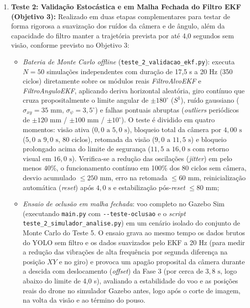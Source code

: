 \begin{enumerate}
	\item \textbf{Teste 2: Validação Estocástica e em Malha Fechada do Filtro EKF (Objetivo 3):} Realizado em duas etapas complementares para testar de forma rigorosa a suavização dos ruídos da câmera e de ângulo, além da capacidade do filtro manter a trajetória prevista por até 4,0 segundos sem visão, conforme previsto no Objetivo 3:
	\begin{itemize}
		\item \textit{Bateria de Monte Carlo offline} (\texttt{teste\_2\_\allowbreak validacao\_\allowbreak ekf.py}): executa $N = 50$ simulações independentes com duração de 17,5 s a 20 Hz (350 ciclos) diretamente sobre os módulos reais \textit{FiltroAlvoEKF} e \textit{FiltroAnguloEKF}, aplicando deriva horizontal aleatória, giro contínuo que cruza propositalmente o limite angular de $\pm 180^\circ$ ($S^1$), ruído gaussiano ($\sigma_{xy} = 35\text{ mm}$, $\sigma_\psi = 3{,}5^\circ$) e falhas pontuais abruptas (\textit{outliers} periódicos de $\pm 120\text{ mm}$ / $\pm 100\text{ mm}$ / $\pm 10^\circ$). O teste é dividido em quatro momentos: visão ativa ($0{,}0\text{ a } 5{,}0\text{ s}$), bloqueio total da câmera por $4{,}00\text{ s}$ ($5{,}0\text{ a } 9{,}0\text{ s}$, 80 ciclos), retomada da visão ($9{,}0\text{ a } 11{,}5\text{ s}$) e bloqueio prolongado acima do limite de segurança ($11{,}5\text{ a } 16{,}0\text{ s}$ com retorno visual em $16{,}0\text{ s}$). Verifica-se a redução das oscilações (\textit{jitter}) em pelo menos $40\%$, o funcionamento contínuo em 100\% dos 80 ciclos sem câmera, desvio acumulado $\le 250\text{ mm}$, erro na retomada $\le 60\text{ mm}$, reinicialização automática (\textit{reset}) após $4{,}0\text{ s}$ e estabilização pós-\textit{reset} $\le 80\text{ mm}$;
		\item \textit{Ensaio de oclusão em malha fechada}: voo completo no Gazebo Sim (executando \texttt{main.py} com \texttt{-{}-teste-\allowbreak oclusao} e o \textit{script} \texttt{teste\_2\_\allowbreak simulador\_\allowbreak analise.py}) em um cenário isolado do conjunto de Monte Carlo do Teste 5. O ensaio grava ao mesmo tempo os dados brutos do YOLO sem filtro e os dados suavizados pelo EKF a 20 Hz (para medir a redução das vibrações de alta frequência por segunda diferença na posição $XY$ e no giro) e provoca um apagão proposital da câmera durante a descida com deslocamento (\textit{offset}) da Fase 3 (por cerca de $3{,}8\text{ s}$, logo abaixo do limite de 4,0 s), avaliando a estabilidade do voo e as posições reais do drone no simulador Gazebo antes, logo após o corte de imagem, na volta da visão e ao término do pouso.
	\end{itemize}
	

\end{enumerate}
